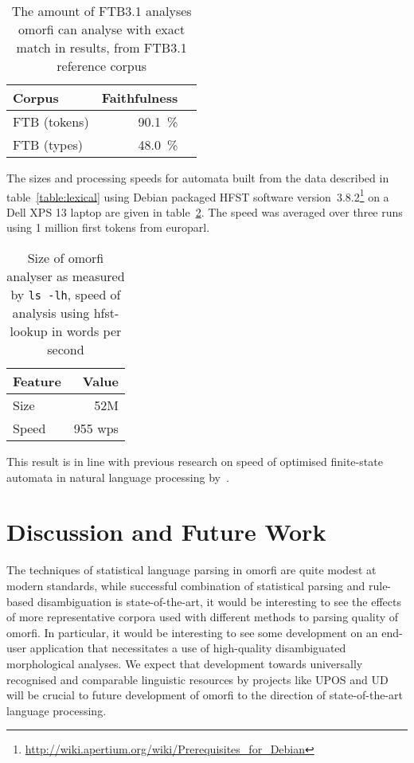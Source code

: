 \documentclass[a4paper,12pt]{article}
\begin{document}
\begin{table}
    \begin{scriptsize}
    \centering
    \begin{tabular}{|l|r|r|}
        \hline
        \bf Corpus & \bf Faithfulness \\
        \hline
        FTB (tokens) & 90.1~\% \\
        FTB (types)  & 48.0~\% \\
        \hline
    \end{tabular}
    \caption{The amount of FTB3.1 analyses omorfi can analyse with exact
    match in results, from FTB3.1 reference corpus\label{table:quality}}
  \end{scriptsize}
\end{table}

The sizes and processing speeds for automata built from the data described in
table~\ref{table:lexical} using Debian packaged HFST software
version~3.8.2\footnote{\url{http://wiki.apertium.org/wiki/Prerequisites_for_Debian}}
on a Dell XPS 13 laptop are given in table~\ref{table:size-speed}. The speed
was averaged over three runs using 1 million first tokens from europarl.

\begin{table}
    \begin{scriptsize}
        \centering
        \begin{tabular}{|l|r|}
            \hline
            \bf Feature & \bf Value \\
            \hline
            Size & 52M \\
            Speed & 955 wps\\
            \hline
        \end{tabular}
        \caption{Size of omorfi analyser as measured by \texttt{ls -lh}, speed
        of analysis using hfst-lookup in words per second \label{table:size-speed}}
    \end{scriptsize}
\end{table}

This result is in line with previous research on speed of optimised finite-state
automata in natural language processing by~\citet{silfverberg2009hfst}.

\section{Discussion and Future Work}
\label{sec:discussion}

The techniques of statistical language parsing in omorfi are quite modest at
modern standards, while successful combination of statistical parsing and
rule-based disambiguation is state-of-the-art, it would be interesting to
see the effects of more representative corpora used with different methods
to parsing quality of omorfi.  In particular, it would be interesting to see
some development on an end-user application that necessitates a use of
high-quality disambiguated morphological analyses. We expect that
development towards universally recognised and comparable linguistic
resources by projects like UPOS and UD will be crucial to future development
of omorfi to the direction of state-of-the-art language processing.
\end{document}
